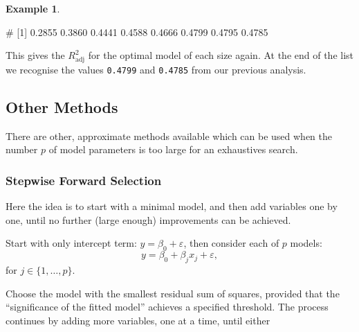 \documentclass[
  a4paper,
]{article}
\newenvironment{Shaded}{\begin{snugshade}}{\end{snugshade}}
\newcommand{\DecValTok}[1]{\textcolor[rgb]{0.00,0.00,0.81}{#1}}
\newcommand{\FunctionTok}[1]{\textcolor[rgb]{0.00,0.00,0.00}{#1}}
\newcommand{\NormalTok}[1]{#1}
\newcommand{\SpecialCharTok}[1]{\textcolor[rgb]{0.00,0.00,0.00}{#1}}
\theoremstyle{definition}
\theoremstyle{definition}
\newtheorem{example}{Example}[section]
\theoremstyle{definition}
\theoremstyle{definition}
\theoremstyle{remark}
\begin{document}
\begin{example}
\begin{Shaded}
\end{Shaded}

\begin{Shaded}
\begin{Highlighting}[]
\NormalTok{\# [1] 0.2855 0.3860 0.4441 0.4588 0.4666 0.4799 0.4795 0.4785}
\end{Highlighting}
\end{Shaded}

This gives the \(R^2_\mathrm{adj}\) for the optimal model of each size
again. At the end of the list we recognise the values \texttt{0.4799} and
\texttt{0.4785} from our previous analysis.
\end{example}

\hypertarget{other-methods}{%
\subsection{Other Methods}\label{other-methods}}

There are other, approximate methods available which can be used
when the number \(p\) of model parameters is too large for an exhaustives
search.

\hypertarget{stepwise-forward-selection}{%
\subsubsection{Stepwise Forward Selection}\label{stepwise-forward-selection}}

Here the idea is to start with a minimal model, and then add variables one by
one, until no further (large enough) improvements can be achieved.

Start with only intercept term: \(y=\beta_0 + \varepsilon\), then
consider each of \(p\) models:
\begin{equation*}
  y
  = \beta_0 + \beta_j x_j + \varepsilon,
\end{equation*}
for \(j \in \{1, \ldots, p\}\).

Choose the model with the smallest residual sum of squares, provided that the
``significance of the fitted model'' achieves a specified threshold. The process
continues by adding more variables, one at a time, until either
\end{document}
